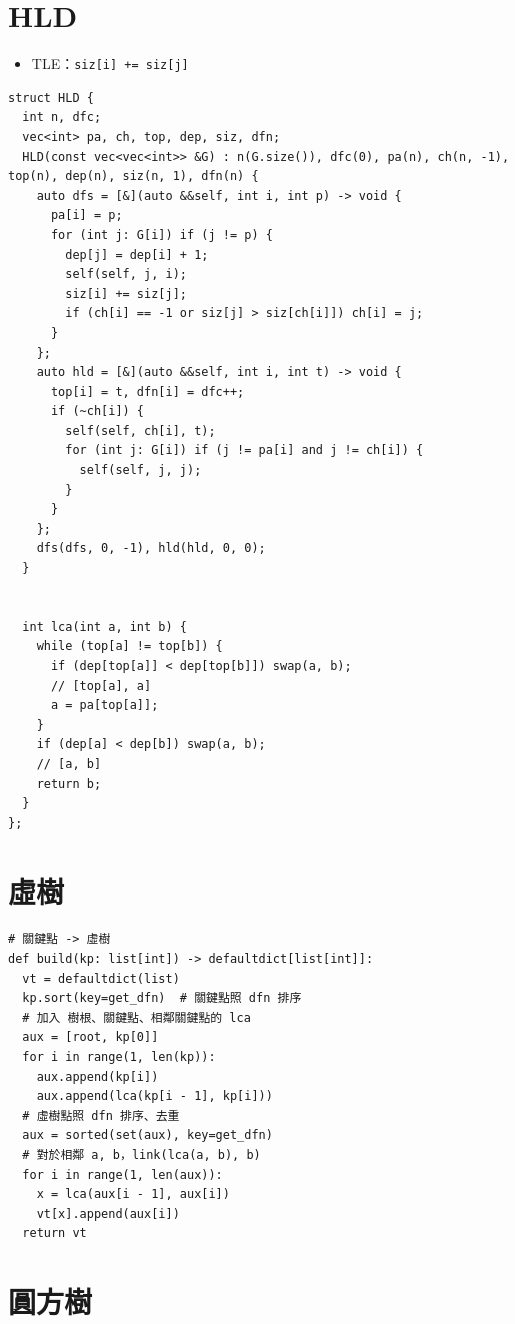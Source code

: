 \documentclass[10pt, a4paper, twocolumn]{article}
\begin{document}
\section{HLD}

\begin{itemize}[tight_item]
    \item TLE：\texttt{siz[i] += siz[j]}
\end{itemize}

\begin{verbatim}
struct HLD {
  int n, dfc;
  vec<int> pa, ch, top, dep, siz, dfn;
  HLD(const vec<vec<int>> &G) : n(G.size()), dfc(0), pa(n), ch(n, -1), top(n), dep(n), siz(n, 1), dfn(n) {
    auto dfs = [&](auto &&self, int i, int p) -> void {
      pa[i] = p;
      for (int j: G[i]) if (j != p) {
        dep[j] = dep[i] + 1;
        self(self, j, i);
        siz[i] += siz[j];
        if (ch[i] == -1 or siz[j] > siz[ch[i]]) ch[i] = j;
      }
    };
    auto hld = [&](auto &&self, int i, int t) -> void {
      top[i] = t, dfn[i] = dfc++;
      if (~ch[i]) {
        self(self, ch[i], t);
        for (int j: G[i]) if (j != pa[i] and j != ch[i]) {
          self(self, j, j);
        }
      }
    };
    dfs(dfs, 0, -1), hld(hld, 0, 0);
  }


  int lca(int a, int b) {
    while (top[a] != top[b]) {
      if (dep[top[a]] < dep[top[b]]) swap(a, b);
      // [top[a], a]
      a = pa[top[a]];
    }
    if (dep[a] < dep[b]) swap(a, b);
    // [a, b]
    return b;
  }
};
\end{verbatim}

\section{虛樹}

\begin{verbatim}
# 關鍵點 -> 虛樹
def build(kp: list[int]) -> defaultdict[list[int]]:
  vt = defaultdict(list)
  kp.sort(key=get_dfn)  # 關鍵點照 dfn 排序
  # 加入 樹根、關鍵點、相鄰關鍵點的 lca
  aux = [root, kp[0]]
  for i in range(1, len(kp)):
    aux.append(kp[i])
    aux.append(lca(kp[i - 1], kp[i]))
  # 虛樹點照 dfn 排序、去重
  aux = sorted(set(aux), key=get_dfn)
  # 對於相鄰 a, b，link(lca(a, b), b)
  for i in range(1, len(aux)):
    x = lca(aux[i - 1], aux[i])
    vt[x].append(aux[i])
  return vt
\end{verbatim}

\section{圓方樹}
\end{document}
